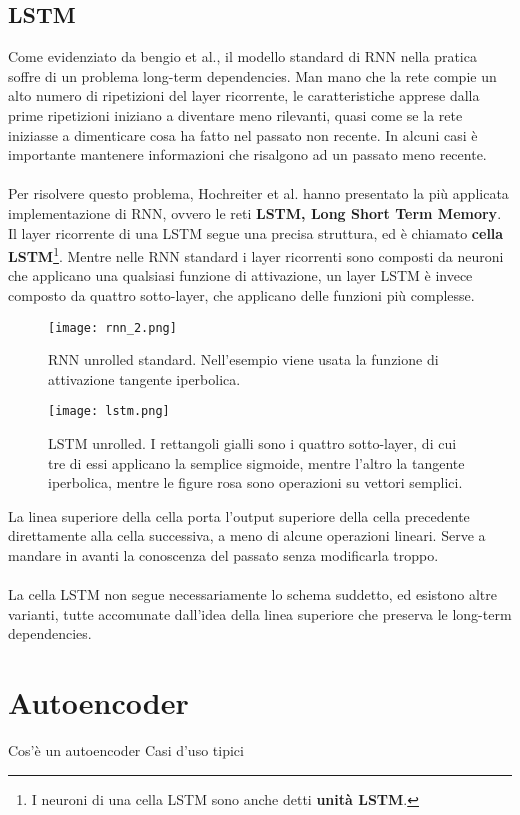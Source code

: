 \subsection{LSTM}
Come evidenziato da bengio et al.\cite{long_term}, il modello standard di RNN nella pratica soffre di un problema long-term dependencies. Man mano che la rete compie un alto numero di ripetizioni del layer ricorrente, le caratteristiche apprese dalla prime ripetizioni iniziano a diventare meno rilevanti, quasi come se la rete iniziasse a dimenticare cosa ha fatto nel passato non recente. In alcuni casi è importante mantenere informazioni che risalgono ad un passato meno recente.\\
\\
Per risolvere questo problema, Hochreiter et al.\cite{lstm} hanno presentato la più applicata implementazione di RNN, ovvero le reti \textbf{LSTM, Long Short Term Memory}.\\
Il layer ricorrente di una LSTM segue una precisa struttura, ed è chiamato \textbf{cella LSTM}\footnote{I neuroni di una cella LSTM sono anche detti \textbf{unità LSTM}.}. Mentre nelle RNN standard i layer ricorrenti sono composti da neuroni che applicano una qualsiasi funzione di attivazione, un layer LSTM è invece composto da quattro sotto-layer, che applicano delle funzioni più complesse.
\begin{figure}[H]
	\centering
	\texttt{[image: rnn\_2.png]}
	\caption{RNN unrolled standard. Nell'esempio viene usata la funzione di attivazione tangente iperbolica.}
	\label{fig:rnn_2}
\end{figure}
\begin{figure}[H]
	\centering
	\texttt{[image: lstm.png]}
	\caption{LSTM unrolled. I rettangoli gialli sono i quattro sotto-layer, di cui tre di essi applicano la semplice sigmoide, mentre l'altro la tangente iperbolica, mentre le figure rosa sono operazioni su vettori semplici.}
	\label{fig:lstm}
\end{figure}
La linea superiore della cella porta l'output superiore della cella precedente direttamente alla cella successiva, a meno di alcune operazioni lineari. Serve a mandare in avanti la conoscenza del passato senza modificarla troppo.\\
\\
La cella LSTM non segue necessariamente lo schema suddetto, ed esistono altre varianti, tutte accomunate dall'idea della linea superiore che preserva le long-term dependencies.

\section{Autoencoder}
Cos'è un autoencoder
Casi d'uso tipici

